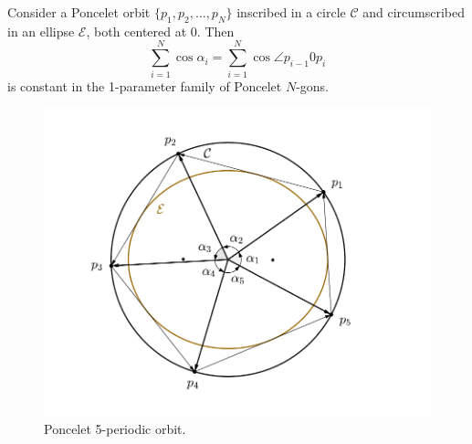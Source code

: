 \begin{theorem}
Consider a Poncelet orbit $\{p_1,p_2,\ldots, p_N\}$ inscribed in a circle $\mathcal{C}$ and circumscribed in an ellipse $
\mathcal{E}$, both centered at $0.$
Then 
\[\sum_{i=1}^N \cos \alpha_i= \sum_{i=1}^N \cos\angle p_{i-1}0p_{i}\] is constant in the 1-parameter family of Poncelet $N$-gons.
\label{th:somacossenos_liouville}
\end{theorem}
\begin{figure}
    \centering
    \includegraphics[scale=0.8]{pics_tex/orbita5_C_E.pdf}
    \caption{Poncelet 5-periodic orbit.}
    \label{fig:orb5_poncelet}
\end{figure}
